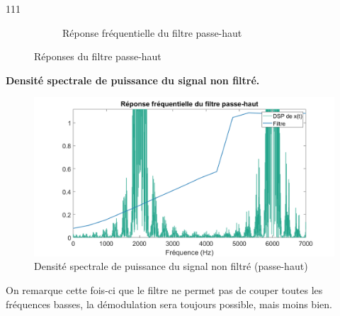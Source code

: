 \begin{dinglist}{111}
\begin{figure}[H]
\begin{subfigure}{0.5\textwidth}
         \caption{Réponse fréquentielle du filtre passe-haut}\label{fig:rep-freq-haut}
      \end{subfigure}
      \caption{Réponses du filtre passe-haut \label{fig : rep-haut}}
   \end{figure}
   \item \textbf{Densité spectrale de puissance du signal non filtré.}
   \begin{figure}[H]
      \centering
      \includegraphics[width=\textwidth]{partie-2/sous-partie-3/2.3.3.8.png}
      \caption{Densité spectrale de puissance du signal non filtré (passe-haut)} \label{fig:spb-nn-filtre-haut}
   \end{figure}
   On remarque cette fois-ci que le filtre ne permet pas de couper toutes les fréquences basses, la démodulation sera toujours possible, mais moins bien.


\end{dinglist}
